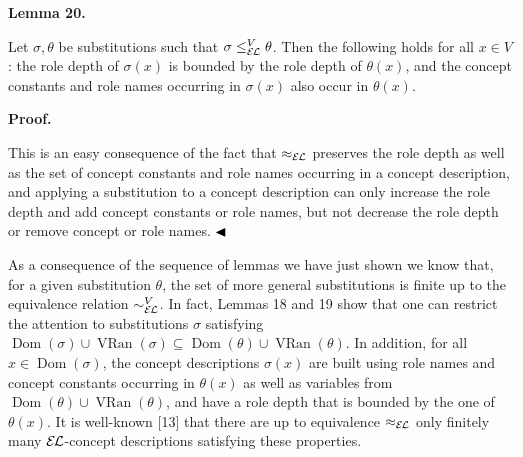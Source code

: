 \documentclass[10pt,a4paper]{amsart}
\begin{document}
  
 
 
\par\medskip\noindent\textbf{Lemma 20.}\par
 
 
Let $\sigma,\theta$ be substitutions such that $\sigma\leq_{\mathcal{E\mkern-1.618muL}}^{V}\theta$. Then the following holds for all $x\in V$: the role depth of $\sigma(x)$ is bounded by the role depth of $\theta(x)$, and the concept constants and role names occurring in $\sigma(x)$ also occur in $\theta(x)$.\par
 
 
 
 
 
\par\medskip\noindent\textbf{Proof.}\par
 
 
This is an easy consequence of the fact that $\approx_{\mathcal{E\mkern-1.618muL}}$ preserves the role depth as well as the set of concept constants and role names occurring in a concept description, and applying a substitution to a concept description can only increase the role depth and add concept constants or role names, but not decrease the role depth or remove concept or role names. $\hfill\blacktriangleleft$\par
 
 
 
As a consequence of the sequence of lemmas we have just shown we know that, for a given substitution $\theta$, the set of more general substitutions is finite up to the equivalence relation $\sim_{\mathcal{E\mkern-1.618muL}}^{V}$. In fact, Lemmas 18 and 19 show that one can restrict the attention to substitutions $\sigma$ satisfying $\operatorname{Dom}(\sigma)\cup\operatorname{VRan}(\sigma)\subseteq%
\operatorname{Dom}(\theta)\cup\operatorname{VRan}(\theta)$. In addition, for all $x\in\operatorname{Dom}(\sigma)$, the concept descriptions $\sigma(x)$ are built using role names and concept constants occurring in $\theta(x)$ as well as variables from $\operatorname{Dom}(\theta)\cup\operatorname{VRan}(\theta)$, and have a role depth that is bounded by the one of $\theta(x)$. It is well-known [13] that there are up to equivalence $\approx_{\mathcal{E\mkern-1.618muL}}$ only finitely many $\mathcal{E\mkern-1.618muL}$-concept descriptions satisfying these properties.\par
 
\end{document}
